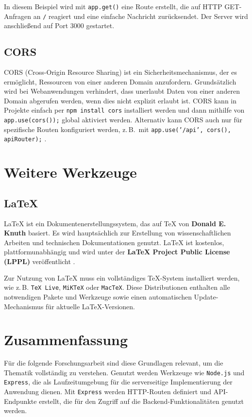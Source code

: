 \documentclass[oneside]{ausarbeitung}
\begin{document}
In diesem Beispiel wird mit \texttt{app.get()} eine Route erstellt, die auf \ac{HTTP} GET-Anfragen an \texttt{/} reagiert und eine einfache Nachricht zurücksendet. Der Server wird anschließend auf Port 3000 gestartet.  

\subsection{CORS}

CORS (Cross-Origin Resource Sharing) ist ein Sicherheitsmechanismus, der es ermöglicht, Ressourcen von einer anderen Domain anzufordern. Grundsätzlich wird bei Webanwendungen verhindert, dass unerlaubt Daten von einer anderen Domain abgerufen werden, wenn dies nicht explizit erlaubt ist. CORS kann in Projekte einfach per \texttt{npm install cors} installiert werden und dann mithilfe von \texttt{app.use(cors());} global aktiviert werden. Alternativ kann CORS auch nur für spezifische Routen konfiguriert werden, z.\,B.\ mit \texttt{app.use('/api', cors(), apiRouter);} \parencite{cors-npm}.

\section{Weitere Werkzeuge}

\subsection{LaTeX}

\LaTeX{} ist ein Dokumentenerstellungssystem, das auf \TeX{} von \textbf{Donald E. Knuth} basiert. Es wird hauptsächlich zur Erstellung von wissenschaftlichen Arbeiten und technischen Dokumentationen genutzt. \LaTeX{} ist kostenlos, plattformunabhängig und wird unter der \textbf{LaTeX Project Public License (LPPL)} veröffentlicht \parencite{latex-project}.  

Zur Nutzung von \LaTeX{} muss ein vollständiges \TeX-System installiert werden, wie z.\,B. \texttt{TeX Live}, \texttt{MiKTeX} oder \texttt{MacTeX}. Diese Distributionen enthalten alle notwendigen Pakete und Werkzeuge sowie einen automatischen Update-Mechanismus für aktuelle \LaTeX-Versionen.  

\section{Zusammenfassung}

Für die folgende Forschungsarbeit sind diese Grundlagen relevant, um die Thematik vollständig zu verstehen. Genutzt werden Werkzeuge wie \texttt{Node.js} und \texttt{Express}, die als Laufzeitumgebung für die serverseitige Implementierung der Anwendung dienen. Mit \texttt{Express} werden \ac{HTTP}-Routen definiert und API-Endpunkte erstellt, die für den Zugriff auf die Backend-Funktionalitäten genutzt werden.  
\end{document}
